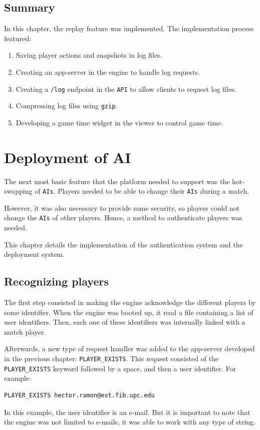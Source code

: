 \documentclass[a4paper,11pt,titlepage,abstract,numbers=noenddot,automark,mnsy,intlimits,rgb,dvipsnames]{report}
\begin{document}
\section{Summary}
In this chapter, the replay feature was implemented. The implementation process featured:
\begin{enumerate}
\item
Saving player actions and snapshots in log files.
\item
Creating an app-server in the engine to handle log requests.
\item
Creating a \texttt{/log} endpoint in the \texttt{API} to allow clients to request log files.
\item
Compressing log files using \texttt{gzip}.
\item
Developing a game time widget in the viewer to control game time.
\end{enumerate}
\chapter{Deployment of AI}
\label{deployment_ai}
The next most basic feature that the platform needed to support was the hot-swapping of \texttt{AIs}. Players needed to be
able to change their \texttt{AIs} during a match.

However, it was also necessary to provide some security, so players could not change the \texttt{AIs} of other players. Hence,
a method to authenticate players was needed.

This chapter details the implementation of the authentication system and the deployment system.
\section{Recognizing players}
The first step consisted in making the engine acknowledge the different players by some identifier. When the engine
was booted up, it read a file containing a list of user identifiers. Then, each one of these identifiers was internally
linked with a match player.

Afterwards, a new type of request handler was added to the app-server developed in the previous chapter: \texttt{PLAYER\_EXISTS}.
This request consisted of the \texttt{PLAYER\_EXISTS} keyword followed by a space, and then a user identifier. For example:
\begin{verbatim}
PLAYER_EXISTS hector.ramon@est.fib.upc.edu
\end{verbatim}
In this example, the user identifier is an e-mail. But it is important to note that the engine was not limited to e-mails,
it was able to work with any type of string.
\end{document}
